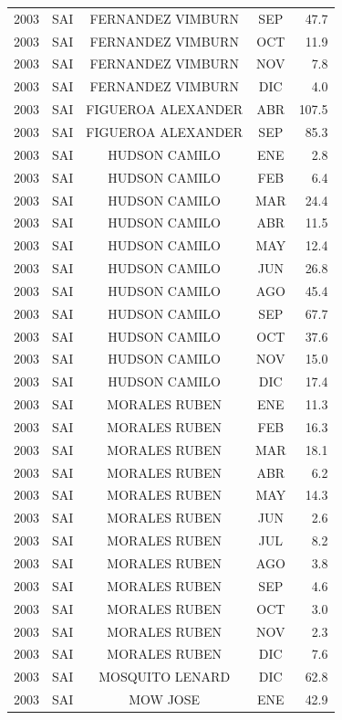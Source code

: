 \documentclass[12pt,]{article}
\begin{document}
\begin{table}[ht]
{\begin{tabular}{lcccr}
  2003 & SAI & FERNANDEZ VIMBURN & SEP & 47.7 \\ 
  2003 & SAI & FERNANDEZ VIMBURN & OCT & 11.9 \\ 
  2003 & SAI & FERNANDEZ VIMBURN & NOV & 7.8 \\ 
  2003 & SAI & FERNANDEZ VIMBURN & DIC & 4.0 \\ 
  2003 & SAI & FIGUEROA ALEXANDER & ABR & 107.5 \\ 
  2003 & SAI & FIGUEROA ALEXANDER & SEP & 85.3 \\ 
  2003 & SAI & HUDSON CAMILO & ENE & 2.8 \\ 
  2003 & SAI & HUDSON CAMILO & FEB & 6.4 \\ 
  2003 & SAI & HUDSON CAMILO & MAR & 24.4 \\ 
  2003 & SAI & HUDSON CAMILO & ABR & 11.5 \\ 
  2003 & SAI & HUDSON CAMILO & MAY & 12.4 \\ 
  2003 & SAI & HUDSON CAMILO & JUN & 26.8 \\ 
  2003 & SAI & HUDSON CAMILO & AGO & 45.4 \\ 
  2003 & SAI & HUDSON CAMILO & SEP & 67.7 \\ 
  2003 & SAI & HUDSON CAMILO & OCT & 37.6 \\ 
  2003 & SAI & HUDSON CAMILO & NOV & 15.0 \\ 
  2003 & SAI & HUDSON CAMILO & DIC & 17.4 \\ 
  2003 & SAI & MORALES RUBEN & ENE & 11.3 \\ 
  2003 & SAI & MORALES RUBEN & FEB & 16.3 \\ 
  2003 & SAI & MORALES RUBEN & MAR & 18.1 \\ 
  2003 & SAI & MORALES RUBEN & ABR & 6.2 \\ 
  2003 & SAI & MORALES RUBEN & MAY & 14.3 \\ 
  2003 & SAI & MORALES RUBEN & JUN & 2.6 \\ 
  2003 & SAI & MORALES RUBEN & JUL & 8.2 \\ 
  2003 & SAI & MORALES RUBEN & AGO & 3.8 \\ 
  2003 & SAI & MORALES RUBEN & SEP & 4.6 \\ 
  2003 & SAI & MORALES RUBEN & OCT & 3.0 \\ 
  2003 & SAI & MORALES RUBEN & NOV & 2.3 \\ 
  2003 & SAI & MORALES RUBEN & DIC & 7.6 \\ 
  2003 & SAI & MOSQUITO LENARD & DIC & 62.8 \\ 
  2003 & SAI & MOW JOSE & ENE & 42.9 \\ 

\end{tabular}}
\end{table}
\end{document}
